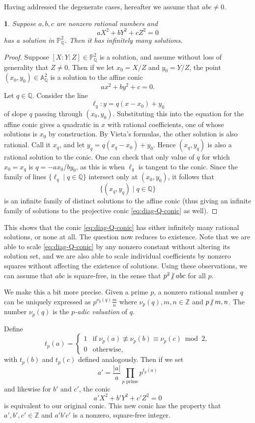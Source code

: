 \documentclass[10pt,a4paper]{amsart}
\numberwithin{equation}{section}
\numberwithin{figure}{section}
\numberwithin{table}{section}
\theoremstyle{definition}
\theoremstyle{plain}
\theoremstyle{remark}
\theoremstyle{plain}
\theoremstyle{definition}
\theoremstyle{plain}
\theoremstyle{plain}
\newtheorem{lem}[thm]{\protect\lemmaname}
\providecommand{\lemmaname}{Lemma}
\newcommand{\A}{\mathbb{A}}
\renewcommand{\P}{\mathbb{P}}
\newcommand{\Z}{\mathbb{Z}}
\newcommand{\Q}{\mathbb{Q}}
\newcommand{\ndiv}{\centernot|}
\begin{document}
	Having addressed the degenerate cases, hereafter we assume that $abc\neq 0$.
	\begin{lem}\label{lem:infinitely-many-Q-soln}
		Suppose $a,b,c$ are nonzero rational numbers and
		\begin{equation}\label{eq:diag-Q-conic}
		aX^2 + bY^2 + cZ^2 = 0
		\end{equation}
		has a solution in $\P^2_\Q$. Then it has infinitely many solutions.
	\end{lem}
	\begin{proof}
		Suppose $[X:Y:Z]\in \P^2_\Q$ is a solution, and assume without loss of generality that $Z\neq 0$. Then if we let $x_0 = X/Z$ and $y_0 = Y/Z$, the point $(x_0,y_0) \in \A^2_\Q$ is a solution to the affine conic
		\[
		ax^2 + by^2 + c = 0.
		\]
		Let $q\in \Q$. Consider the line
		\[
		\ell_q\colon y = q(x-x_0) + y_0
		\]
		of slope $q$ passing through $(x_0,y_0)$. Substituting this into the equation for the affine conic gives a quadratic in $x$ with rational coefficients, one of whose solutions is $x_0$ by construction. By Vieta's formulas, the other solution is also rational. Call it $x_q$, and let $y_q = q(x_q - x_0) + y_0$. Hence $(x_q,y_q)$ is also a rational solution to the conic. One can check that only value of $q$ for which $x_0 = x_q$ is $q = -ax_0 / by_0$, as this is when $\ell_q$ is tangent to the conic. Since the family of lines $\{\ell_q \mid q\in\Q\}$ intersect only at $(x_0,y_0)$, it follows that
		\[
		\{(x_q,y_q) \mid q\in\Q\}
		\]
		is an infinite family of distinct solutions to the affine conic (thus giving an infinite family of solutions to the projective conic \eqref{eq:diag-Q-conic} as well).
	\end{proof}
	This shows that the conic \eqref{eq:diag-Q-conic} has either infinitely many rational solutions, or none at all. The question now reduces to existence. Note that we are able to scale \eqref{eq:diag-Q-conic} by any nonzero constant without altering its solution set, and we are also able to scale individual coefficients by nonzero squares without affecting the existence of solutions. Using these observations, we can assume that $abc$ is square-free, in the sense that $p^2\ndiv abc$ for all $p$.
	
	We make this a bit more precise. Given a prime $p$, a nonzero rational number $q$ can be uniquely expressed as $p^{\nu_p(q)}\frac{m}{n}$ where $\nu_p(q),m,n\in\Z$ and $p\ndiv m,n$. The number $\nu_p(q)$ is the \emph{$p$-adic valuation} of $q$.
	
	Define
	\[
	t_p(a) = \begin{cases}
	1 & \text{if } \nu_p(a)\not\equiv\nu_p(b)\equiv\nu_p(c)\bmod 2,\\
	0 & \text{otherwise,}
	\end{cases}
	\]
	with $t_p(b)$ and $t_p(c)$ defined analogously. Then if we set
	\begin{equation}\label{eq:t_p-squarefree}
	a' = \frac{|a|}{a}\prod_{p \text{ prime}} p^{t_p(a)}
	\end{equation}
	and likewise for $b'$ and $c'$, the conic
	\[
	a'X^2 + b'Y^2 + c'Z^2 = 0
	\]
	is equivalent to our original conic. This new conic has the property that $a',b',c'\in \Z$ and $a'b'c'$ is a nonzero, square-free integer.
	
\end{document}
